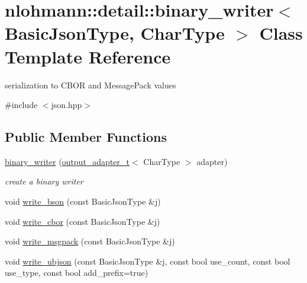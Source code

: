 \hypertarget{classnlohmann_1_1detail_1_1binary__writer}{}\section{nlohmann\+:\+:detail\+:\+:binary\+\_\+writer$<$ Basic\+Json\+Type, Char\+Type $>$ Class Template Reference}
\label{classnlohmann_1_1detail_1_1binary__writer}


serialization to C\+B\+OR and Message\+Pack values  




{\ttfamily \#include $<$json.\+hpp$>$}

\subsection*{Public Member Functions}
\begin{DoxyCompactItemize}
\item 
\hyperlink{classnlohmann_1_1detail_1_1binary__writer_a373289af95a946c19bb4a58a5df71a78}{binary\+\_\+writer} (\hyperlink{namespacenlohmann_1_1detail_a9b680ddfb58f27eb53a67229447fc556}{output\+\_\+adapter\+\_\+t}$<$ Char\+Type $>$ adapter)
\begin{DoxyCompactList}\small\item\em create a binary writer \end{DoxyCompactList}\item 
void \hyperlink{classnlohmann_1_1detail_1_1binary__writer_a9ffc566db5219b473762462234b47db9}{write\+\_\+bson} (const Basic\+Json\+Type \&j)
\item 
void \hyperlink{classnlohmann_1_1detail_1_1binary__writer_aa0ab8d27fd88a33a2f801413ac4c7fbc}{write\+\_\+cbor} (const Basic\+Json\+Type \&j)
\item 
void \hyperlink{classnlohmann_1_1detail_1_1binary__writer_ae4e0852b64102ce4b07d99f08f828b7c}{write\+\_\+msgpack} (const Basic\+Json\+Type \&j)
\item 
void \hyperlink{classnlohmann_1_1detail_1_1binary__writer_a0f6c65053d859269f88eb4ebb0cd7060}{write\+\_\+ubjson} (const Basic\+Json\+Type \&j, const bool use\+\_\+count, const bool use\+\_\+type, const bool add\+\_\+prefix=true)
\end{DoxyCompactItemize}
